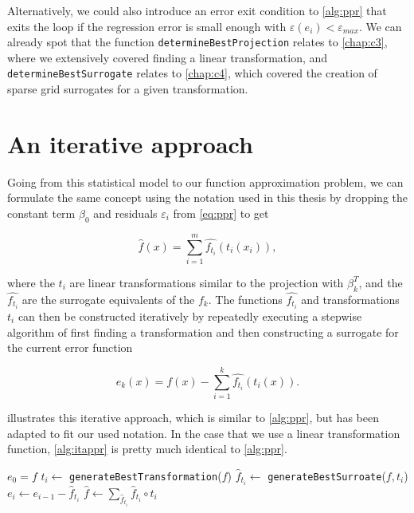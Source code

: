 \documentclass[
  a4paper,  %
  twoside,  %
  bibliography=totoc,
  headsepline,
  cleardoublepage=empty,
  parskip=half,
  draft=false
]{scrbook}
\begin{document}
Alternatively, we could also introduce an error exit condition to \cref{alg:ppr} that exits the loop if the regression error is small enough with $\varepsilon(e_i) < \varepsilon_{max}$.
We can already spot that the function \texttt{determineBestProjection} relates to \cref{chap:c3}, where we extensively covered finding a linear transformation, and \texttt{determineBestSurrogate} relates to \cref{chap:c4}, which covered the creation of sparse grid surrogates for a given transformation.

\section{An iterative approach}

Going from this statistical model to our function approximation problem, we can formulate the same concept using the notation used in this thesis by dropping the constant term $\beta_0$ and residuals $\varepsilon_i$ from \cref{eq:ppr} to get

\begin{equation}
\hat{f}(x)=\sum_{i=1}^m \hat{f_{t_i}}(t_i(x_i)),
\nonumber
\end{equation}

where the $t_i$ are linear transformations similar to the projection with $\beta_k^T$, and the $\hat{f_{t_i}}$ are the surrogate equivalents of the $f_k$.
The functions $\hat{f_{t_i}}$ and transformations $t_i$ can then be constructed iteratively by repeatedly executing a stepwise algorithm of first finding a transformation and then constructing a surrogate for the current error function

\begin{equation}
e_k(x)=f(x) - \sum_{i=1}^k \hat{f_{t_i}}(t_i(x)).
\nonumber
\end{equation}

 illustrates this iterative approach, which is similar to \cref{alg:ppr}, but has been adapted to fit our used notation.
In the case that we use a linear transformation function, \cref{alg:itappr} is pretty much identical to \cref{alg:ppr}.

\begin{mdframed}[style=algstyle,frametitle={\textbf{function} \texttt{transformedSurrogateSum}{$(f, i_{\text{max}})$}}]
\normalsize
\vspace{5.5mm}
\begin{algorithmic}[1]
    \State $e_0 = f$
    	\State $t_i \gets$ \texttt{generateBestTransformation}($f$)
    	\State $\hat{f}_{t_i} \gets$ \texttt{generateBestSurroate}($f, t_i$)
    	\State $e_i \gets e_{i - 1} - \hat{f}_{t_i}$
    \EndFor
    \State $\hat{f} \gets \sum_{\hat{f}_{t_i}} \hat{f}_{t_i} \circ t_i$
    \State {}
\end{algorithmic}
\vspace{-1.5mm}
\delimit
	\label{alg:itappr}
\end{mdframed}
\end{document}
